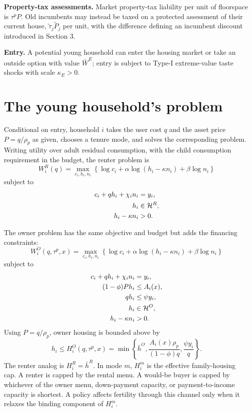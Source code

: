 \documentclass[11pt]{article}
\newcommand{\1}{\mathbf 1}
\newcommand{\HH}{\mathcal H}
\begin{document}
\textbf{Property-tax assessments.} Market property-tax liability per unit of floorspace is $\tau^p P$. Old incumbents may instead be taxed on a protected assessment of their current house, $\tilde\tau_j\tilde P_j$ per unit, with the difference defining an incumbent discount introduced in Section 3.

\textbf{Entry.} A potential young household can enter the housing market or take an outside option with value $\bar W^E$; entry is subject to Type-I extreme-value taste shocks with scale $\kappa_E>0$.

\section{The young household's problem}

Conditional on entry, household $i$ takes the user cost $q$ and the asset price $P=q/\rho_p$ as given, chooses a tenure mode, and solves the corresponding problem. Writing utility over adult residual consumption, with the child consumption requirement in the budget, the renter problem is
\begin{equation}
W_i^R(q)
=
\max_{c_i,h_i,n_i}
\left\{
\log c_i+\alpha\log(h_i-\kappa n_i)+\beta\log n_i
\right\}
\label{eq:compact_renter_problem}
\end{equation}
subject to
\begin{align}
c_i+q h_i+\chi_i n_i&=y_i,
\label{eq:compact_renter_budget}\\
h_i&\in\HH^R,
\label{eq:compact_renter_menu}\\
h_i-\kappa n_i&>0.
\notag
\end{align}

The owner problem has the same objective and budget but adds the financing constraints:
\begin{equation}
W_i^O(q,\tau^p,x)
=
\max_{c_i,h_i,n_i}
\left\{
\log c_i+\alpha\log(h_i-\kappa n_i)+\beta\log n_i
\right\}
\label{eq:compact_owner_problem_young}
\end{equation}
subject to
\begin{align}
c_i+q h_i+\chi_i n_i&=y_i,
\label{eq:compact_owner_budget_young}\\
(1-\phi)P h_i&\le A_i(x),
\label{eq:compact_owner_dp}\\
q h_i&\le \psi y_i,
\label{eq:compact_owner_pti}\\
h_i&\in\HH^O,
\notag\\
h_i-\kappa n_i&>0.
\notag
\end{align}
Using $P=q/\rho_p$, owner housing is bounded above by
\[
h_i\le
H_i^O(q,\tau^p,x)
=
\min\left\{
\bar h^O,
\frac{A_i(x)\rho_p}{(1-\phi)q},
\frac{\psi y_i}{q}
\right\}.
\]
The renter analog is $H_i^R=\bar h^R$. In mode $m$, $H_i^m$ is the effective family-housing cap. A renter is capped by the rental menu. A would-be buyer is capped by whichever of the owner menu, down-payment capacity, or payment-to-income capacity is shortest. A policy affects fertility through this channel only when it relaxes the binding component of $H_i^m$.
\end{document}
